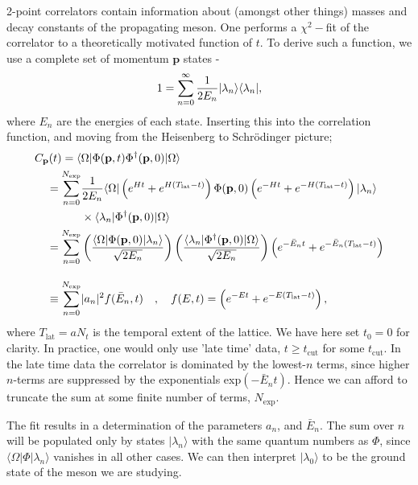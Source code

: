 2-point correlators contain information about (amongst other things) masses and decay constants of the propagating meson. One performs a $\chi^2-$fit of the correlator to a theoretically motivated function of $t$. To derive such a function, we use a complete set of momentum ${\textbf{p}}$ states -
\begin{align}
  1 = \sum_{n=0}^{\infty} {1\over 2E_n} | \lambda_n \rangle \langle \lambda_n |,
\end{align}
where $E_n$ are the energies of each state. Inserting this into the correlation function, and moving from the Heisenberg to Schr\"odinger picture;
\begin{align}
  C_{\textbf{p}}(t) = \langle& \Omega | \Phi({\textbf{p}},t) \Phi^{\dagger}({\textbf{p}},0)|\Omega\rangle \nonumber \\
  =\sum_{n=0}^{N_{\text{exp}}} & {1\over 2E_n} \langle \Omega | \left( e^{Ht} + e^{H(T_{\text{lat}}-t)} \right)  \Phi({\textbf{p}},0) \left( e^{-Ht} + e^{-H(T_{\text{lat}}-t)} \right) | \lambda_n \rangle
  \nonumber
  \\
  &\times \langle \lambda_n | \Phi^{\dagger}({\textbf{p}},0) | \Omega \rangle
  \nonumber
  \\  = \sum_{n=0}^{N_{\text{exp}}} & \left( {\langle \Omega | \Phi({\textbf{p}},0) | \lambda_n \rangle \over \sqrt{2E_n}} \right) \left( {\langle \lambda_n | \Phi^{\dagger}({\textbf{p}},0) | \Omega \rangle \over \sqrt{2E_n} } \right) \left( e^{-\bar{E}_n t} + e^{-\bar{E}_n (T_{\text{lat}}-t)} \right)
  \nonumber
  \\[10pt] \equiv \sum_{n=0}^{N_{\text{exp}}} & |a_n|^2 f(\bar{E}_n,t) \quad,\quad f(E,t) = \left( e^{-E t} + e^{-E(T_{\text{lat}}-t)} \right),
  \label{eq:multiexponential}
\end{align}
where $T_{\text{lat}}=aN_t$ is the temporal extent of the lattice. We have here set $t_0=0$ for clarity. In practice, one would only use 'late time' data,  $t\geq t_{\text{cut}}$ for some $t_{\text{cut}}$. In the late time data the correlator is dominated by the lowest-$n$ terms, since higher $n$-terms are suppressed by the exponentials exp$(-\bar{E}_nt)$. Hence we can afford to truncate the sum at some finite number of terms, $N_{\text{exp}}$. 

The fit results in a determination of the parameters $a_n$, and $\bar{E}_n$. The sum over $n$ will be populated only by states $|\lambda_n\rangle$ with the same quantum numbers as $\Phi$, since $\langle\Omega | \Phi | \lambda_n \rangle$ vanishes in all other cases. We can then interpret $|\lambda_0\rangle$ to be the ground state of the meson we are studying. 

